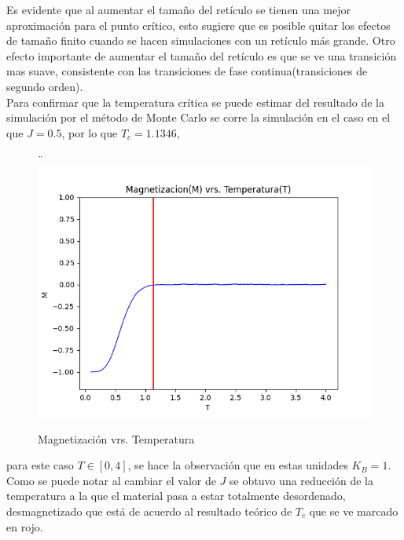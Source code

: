 \documentclass[a4paper]{article}
\begin{document}
Es evidente que al aumentar el tamaño del retículo se tienen una mejor aproximación para el punto crítico, esto sugiere que es posible quitar los efectos de tamaño finito cuando se hacen simulaciones con un retículo más grande. Otro efecto importante de aumentar el tamaño del retículo es que se ve una transición mas suave, consistente con las transiciones de fase continua(transiciones de segundo orden).\\
Para confirmar que la temperatura crítica se puede estimar del resultado de la simulación por el método de Monte Carlo se  corre la simulación en el caso en el que $J=0.5$, por lo que $T_c=1.1346$,
\begin{figure}[H]
\begin{center}
¨\includegraphics[scale=0.6]{PlotMvT_sim1_v04.png} 
\end{center} 
\caption{Magnetización vrs. Temperatura}
\end{figure}
para este caso $T\in[0,4]$, se hace la observación que en estas unidades $K_B=1$. Como se puede notar al cambiar el valor de $J$ se obtuvo una reducción de la temperatura a la que el material pasa a estar totalmente desordenado, desmagnetizado que está de acuerdo al resultado teórico de $T_c$ que se ve marcado en rojo.
\end{document}
